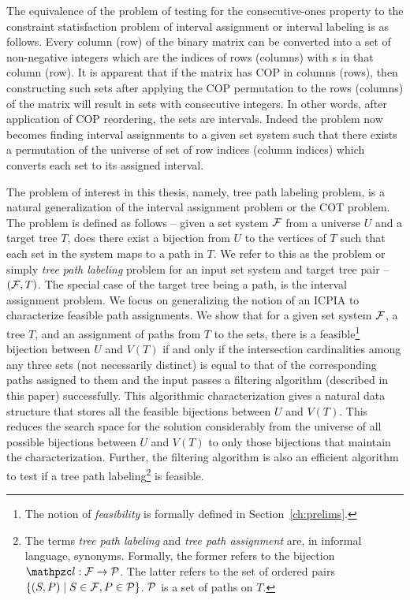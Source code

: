 The equivalence of the problem of testing for the consecutive-ones
property to the constraint statisfaction problem of interval
assignment \cite{nsnrs09} or interval labeling \cite{kklv10} is as
follows. Every column (row) of the binary matrix can be converted into
a set of non-negative integers which are the indices of rows (columns)
with {\un}s in that column (row). It is apparent that if the matrix
has COP in columns (rows), then constructing such sets after applying
the COP permutation to the rows (columns) of the matrix will result in
sets with consecutive integers. In other words, after application of
COP reordering, the sets are intervals. Indeed the problem now becomes
finding interval assignments to a given set system such that there
exists a permutation of the universe of set of row indices (column
indices) which converts each set to its assigned interval.

The problem of interest in this thesis, namely, tree path labeling
problem, is a natural generalization of the interval assignment
problem or the COT problem. The problem is defined as follows -- given
a set system ${\cal F}$ from a universe $U$ and a target tree $T$, does
there exist a bijection from $U$ to the vertices of $T$ such that each
set in the system maps to a path in $T$.  We refer to this as the
{\CFTPL} problem or simply {\em tree path labeling} problem for an
input set system and target tree pair -- $({\cal F},T)$. The special case
of the target tree being a path, is the interval assignment problem.
We focus on generalizing the notion of an ICPIA \cite{nsnrs09} to
characterize feasible path assignments.  We show that for a given set
system ${\cal F}$, a tree $T$, and an assignment of paths from $T$ to the
sets, there is a feasible\footnote{The notion of {\em feasibility} is
  formally defined in Section~\ref{ch:prelims}.}  bijection between
$U$ and $V(T)$ if and only if the intersection cardinalities among any
three sets (not necessarily distinct) is equal to that of the
corresponding paths assigned to them and the input passes a filtering
algorithm (described in this paper) successfully.  This algorithmic
characterization gives a natural data structure that stores all the
 feasible bijections between $U$ and $V(T)$. This
reduces the search space for the solution considerably from the
universe of all possible bijections between $U$ and $V(T)$ to only
those bijections that maintain the characterization.  Further, the
filtering algorithm is also an efficient algorithm to test if a tree
path labeling\footnote{The terms {\em tree path labeling} and {\em
    tree path assignment} are, in informal language,
  synonyms. Formally, the former refers to the bijection $\cl: \cF
  \rightarrow \cP$. The latter refers to the set of ordered pairs
  $\{(S, P) \mid S \in {\cal F}, P \in {\cal P}\}$. ${\cal P}$ is a set of paths on
  $T$.} is feasible.


